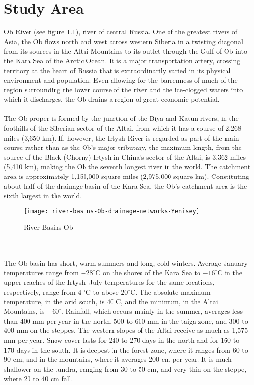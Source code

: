 \chapter{Study Area}
Ob River (see figure \ref{fig:Ob Basin}), river of central Russia. One of the greatest rivers of Asia, the Ob flows north and west across western Siberia in a twisting diagonal from its sources in the Altai Mountains to its outlet through the Gulf of Ob into the Kara Sea of the Arctic Ocean. It is a major transportation artery, crossing territory at the heart of Russia that is extraordinarily varied in its physical environment and population. Even allowing for the barrenness of much of the region surrounding the lower course of the river and the ice-clogged waters into which it discharges, the Ob drains a region of great economic potential.\\\\
The Ob proper is formed by the junction of the Biya and Katun rivers, in the foothills of the Siberian sector of the Altai, from which it has a course of 2,268 miles (3,650 km). If, however, the Irtysh River is regarded as part of the main course rather than as the Ob's major tributary, the maximum length, from the source of the Black (Chorny) Irtysh in China's sector of the Altai, is 3,362 miles (5,410 km), making the Ob the seventh longest river in the world. The catchment area is approximately 1,150,000 square miles (2,975,000 square km). Constituting about half of the drainage basin of the Kara Sea, the Ob's catchment area is the sixth largest in the world.
\begin{figure}[htbp]
	\centering
	\texttt{[image: river-basins-Ob-drainage-networks-Yenisey]} %
	\caption{River Basins Ob} 
	\label{fig:Ob Basin}
\end{figure}\\\\
The Ob basin has short, warm summers and long, cold winters. Average January temperatures range from  $-28 ^{\circ}$C on the shores of the Kara Sea to $-16 ^{\circ}$C in the upper reaches of the Irtysh. July temperatures for the same locations, respectively, range from 4 $^{\circ}$C to above $20 ^{\circ}$C. The absolute maximum temperature, in the arid south, is $40 ^{\circ}$C, and the minimum, in the Altai Mountains, is $-60 ^{\circ}$. Rainfall, which occurs mainly in the summer, averages less than 400 mm per year in the north, 500 to 600 mm in the taiga zone, and 300 to 400 mm on the steppes. The western slopes of the Altai receive as much as 1,575 mm per year. Snow cover lasts for 240 to 270 days in the north and for 160 to 170 days in the south. It is deepest in the forest zone, where it ranges from 60 to 90 cm, and in the mountains, where it averages 200 cm per year. It is much shallower on the tundra, ranging from 30 to 50 cm, and very thin on the steppe, where 20 to 40 cm fall.\\\\
